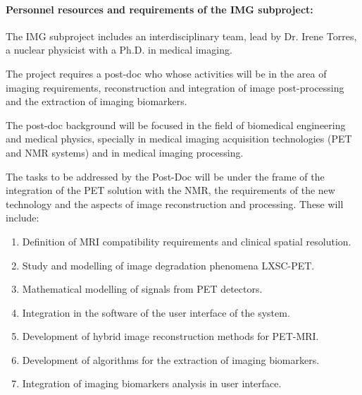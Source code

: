  \paragraph{Personnel resources and requirements of the IMG subproject:}
 The IMG subproject includes an interdisciplinary team, lead by Dr. Irene Torres, a nuclear physicist with a Ph.D. in medical imaging. 
 
 The project requires a post-doc who whose activities will be in the area of imaging requirements, reconstruction and integration of image post-processing and the extraction of imaging biomarkers.
 
The post-doc background will be focused in the field of biomedical engineering and medical physics, specially in medical imaging acquisition technologies (PET and NMR systems) and in medical imaging processing.
 
The tasks to be addressed by the Post-Doc will be under the frame of the integration of the PET solution with the NMR, the requirements of the new technology and the aspects of image reconstruction and processing. These will include:
 \begin{enumerate}
\item Definition of MRI compatibility requirements and clinical spatial resolution.
\item Study and modelling of image degradation phenomena LXSC-PET.
\item Mathematical modelling of signals from PET detectors.
\item Integration in the software of the user interface of the system.
\item Development of hybrid image reconstruction methods for PET-MRI.
\item Development of algorithms for the extraction of imaging biomarkers.
\item Integration of imaging biomarkers analysis in user interface.
\end{enumerate}
